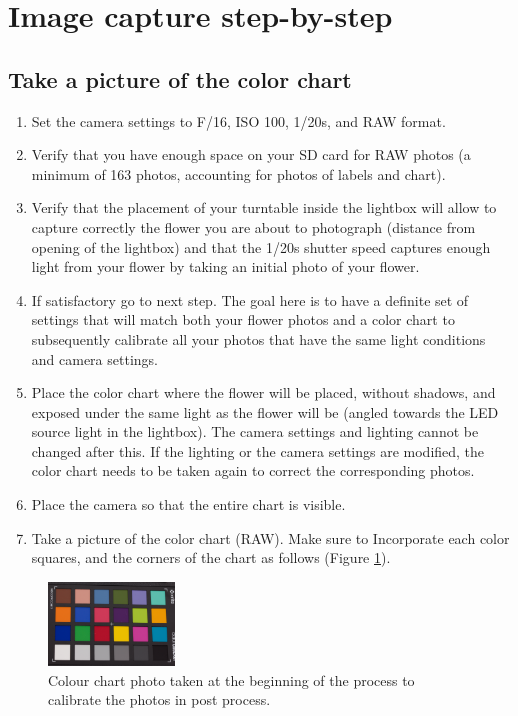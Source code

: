 \documentclass[10pt,letter,english]{article}
\begin{document}
\section{Image capture step-by-step}

\subsection{Take a picture of the color chart}
\begin{enumerate}
    \item Set the camera settings to F/16, ISO 100, 1/20s, and RAW format.
    \item Verify that you have enough space on your SD card for RAW photos (a minimum of 163 photos, accounting for photos of labels and chart).
    \item Verify that the placement of your turntable inside the lightbox will allow to capture correctly the flower you are about to photograph (distance from opening of the lightbox) and that the 1/20s shutter speed captures enough light from your flower by taking an initial photo of your flower.
    \item If satisfactory go to next step. The goal here is to have a definite set of settings that will match both your flower photos and a color chart to subsequently calibrate all your photos that have the same light conditions and camera settings.
   \item Place the color chart where the flower will be placed, without shadows, and exposed under the same light as the flower will be (angled towards the LED source light in the lightbox). The camera settings and lighting cannot be changed after this. If the lighting or the camera settings are modified, the color chart needs to be taken again to correct the corresponding photos.
   \item Place the camera so that the entire chart is visible.
   \item Take a picture of the color chart (RAW). Make sure to Incorporate each color squares, and the corners of the chart as follows (Figure \ref{colorchart}).
   \end{enumerate}


\begin{figure}[H]
\centering
\includegraphics[width=0.3\textwidth]{Figures/chart_example.png}
\caption{Colour chart photo taken at the beginning of the process to calibrate the photos in post process.}
\label{colorchart}
\end{figure}
\end{document}
